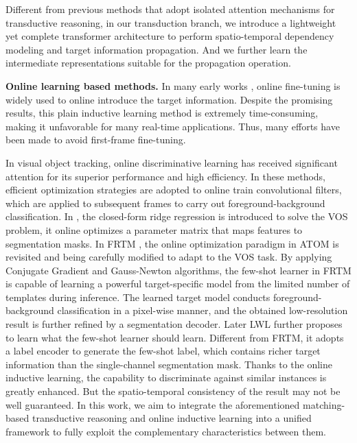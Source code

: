 \documentclass[10pt,twocolumn,letterpaper]{article}
\begin{document}
Different from previous methods \cite{Seoung2019A,Zhang2020A} that adopt isolated attention mechanisms for transductive reasoning, in our transduction branch, we introduce a lightweight yet complete transformer architecture to perform spatio-temporal dependency modeling and target information propagation. And we further learn the intermediate representations suitable for the propagation operation.

\noindent\textbf{Online learning based methods.} 
In many early works \cite{Bao2018A,Cae2017A,static2017A,dyenet2018,premvos2018A,Man2018B,onavos2017A,MoNet2018A},
online fine-tuning is widely used to online introduce the target information. Despite the promising results, this plain inductive learning method is extremely time-consuming, making it unfavorable for many real-time applications. Thus, many efforts \cite{blazingly2018A,TrackPart2018A,d3s2020A,siamask2019A,OSMN2018A,Zhang_luhuchuan_2019A} have been made to avoid first-frame fine-tuning.

In visual object tracking, online discriminative learning  \cite{dimp2019A,eco2017A,atom2019A,prdimp2020A,Wang_2021_Transformer} has received significant attention for its superior performance and high efficiency. In these methods, efficient optimization strategies are adopted to online train convolutional filters, which are applied to subsequent frames to carry out foreground-background classification. In \cite{META2019A}, the closed-form ridge regression \cite{MLCS2019A} is introduced to solve the VOS problem, it online optimizes a parameter matrix that maps features to segmentation masks. In FRTM \cite{frtm2020A}, the online optimization paradigm in ATOM \cite{atom2019A} is revisited and being carefully modified to adapt to the VOS task. By applying Conjugate Gradient and Gauss-Newton algorithms, the few-shot learner in FRTM is capable of learning a powerful target-specific model from the limited number of templates during inference. The learned target model conducts foreground-background classification in a pixel-wise manner, and the obtained low-resolution result is further refined by a segmentation decoder. Later LWL \cite{Goutam2020A} further proposes to learn what the few-shot learner should learn. Different from FRTM, it adopts a label encoder to generate the few-shot label, which contains richer target information than the single-channel segmentation mask. Thanks to the online inductive learning, the capability to discriminate against similar instances is greatly enhanced. But the spatio-temporal consistency of the result may not be well guaranteed.
In this work, we aim to integrate the aforementioned matching-based transductive reasoning and online inductive learning into a unified framework to fully exploit the complementary characteristics between them.
\end{document}
